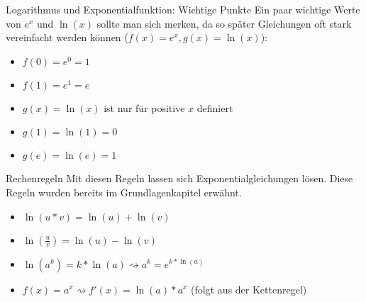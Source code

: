 \begin{bla}{Logarithmus und Exponentialfunktion: Wichtige Punkte}
  Ein paar wichtige Werte von $e^x$ und $\ln(x)$ sollte man sich merken, da so später Gleichungen oft stark vereinfacht werden können ($f(x)=e^x, g(x)=\ln(x)$):
  \begin{itemize}
    \item $f(0)=e^0=1$
    \item $f(1)=e^1=e$
    \item $g(x)=\ln(x)$ ist nur für positive $x$ definiert
    \item $g(1)=\ln(1)=0$
    \item $g(e)=\ln(e)=1$
  \end{itemize}
\end{bla}

\begin{bla}{Rechenregeln}
  Mit diesen Regeln lassen sich Exponentialgleichungen lösen. Diese Regeln wurden bereits im Grundlagenkapitel erwähnt.
  \begin{itemize}
    \item $\ln(u*v)=\ln(u)+\ln(v)$
    \item $\ln(\frac{u}{v})=\ln(u)-\ln(v)$
    \item $\ln(a^k)=k*\ln(a) \rightsquigarrow a^k=e^{k*\ln(a)}$
    \item $f(x)=a^x \rightsquigarrow f'(x)=\ln(a)*a^x$ (folgt aus der Kettenregel)
  \end{itemize}
\end{bla}

